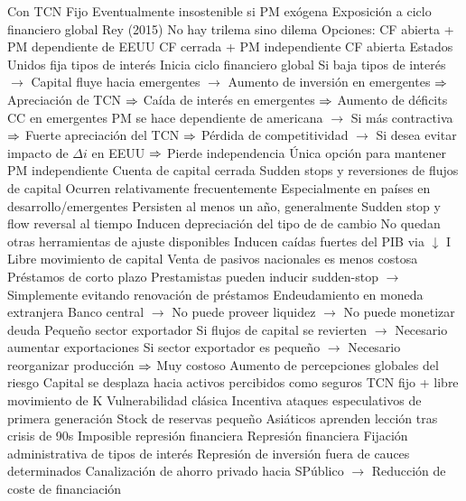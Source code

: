 \documentclass{nuevotema}
\begin{document}
\begin{esquemal}
				\4 Con TCN Fijo
				\4[] Eventualmente insostenible si PM exógena
			\3 Exposición a ciclo financiero global
				\4 Rey (2015)
				\4 No hay trilema sino dilema
				\4 Opciones:
				\4[] CF abierta + PM dependiente de EEUU
				\4[] CF cerrada + PM independiente
				\4 CF abierta
				\4[] Estados Unidos fija tipos de interés
				\4[] Inicia ciclo financiero global
				\4[] Si baja tipos de interés
				\4[] $\to$ Capital fluye hacia emergentes
				\4[] $\to$ Aumento de inversión en emergentes
				\4[] $\Rightarrow$ Apreciación de TCN
				\4[] $\Rightarrow$ Caída de interés en emergentes
				\4[] $\Rightarrow$ Aumento de déficits CC en emergentes
				\4[] PM se hace dependiente de americana
				\4[] $\to$ Si más contractiva
				\4[] $\Rightarrow$ Fuerte apreciación del TCN
				\4[] $\Rightarrow$ Pérdida de competitividad
				\4[] $\to$ Si desea evitar impacto de $\Delta i$ en EEUU
				\4[] $\Rightarrow$ Pierde independencia
				\4 Única opción para mantener PM independiente
				\4[] Cuenta de capital cerrada
			\3 Sudden stops y reversiones de flujos de capital
				\4 Ocurren relativamente frecuentemente
				\4 Especialmente en países en desarrollo/emergentes
				\4 Persisten al menos un año, generalmente
				\4 Sudden stop y flow reversal al tiempo
				\4 Inducen depreciación del tipo de de cambio
				\4[] No quedan otras herramientas de ajuste disponibles
				\4 Inducen caídas fuertes del PIB via $\downarrow$ I
				\4 Libre movimiento de capital
				\4[] Venta de pasivos nacionales es menos costosa
				\4 Préstamos de corto plazo
				\4[] Prestamistas pueden inducir sudden-stop
				\4[] $\to$ Simplemente evitando renovación de préstamos
				\4 Endeudamiento en moneda extranjera
				\4[] Banco central
				\4[] $\to$ No puede proveer liquidez
				\4[] $\to$ No puede monetizar deuda
				\4 Pequeño sector exportador
				\4[] Si flujos de capital se revierten
				\4[] $\to$ Necesario aumentar exportaciones
				\4[] Si sector exportador es pequeño
				\4[] $\to$ Necesario reorganizar producción
				\4[] $\Rightarrow$ Muy costoso
				\4 Aumento de percepciones globales del riesgo
				\4[] Capital se desplaza hacia activos percibidos como seguros
				\4 TCN fijo + libre movimiento de K
				\4[] Vulnerabilidad clásica
				\4[] Incentiva ataques especulativos de primera generación
				\4 Stock de reservas pequeño
				\4[] Asiáticos aprenden lección tras crisis de 90s
			\3 Imposible represión financiera
				\4 Represión financiera
				\4[] Fijación administrativa de tipos de interés
				\4[] Represión de inversión fuera de cauces determinados
				\4[] Canalización de ahorro privado hacia SPúblico
				\4[] $\to$ Reducción de coste de financiación

\end{esquemal}
\end{document}

